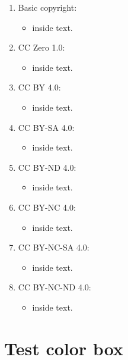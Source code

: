 \begin{enumerate}

\item Basic copyright:
\begin{itemize}
\item \myCopyright inside text.
\end{itemize}

\item CC Zero 1.0: 
\begin{itemize}
\item \CCZEROLicense inside text.
\end{itemize}

\item CC BY 4.0:
\begin{itemize}
\item \CCBYLicense inside text.
\end{itemize}

\item CC BY-SA 4.0:
\begin{itemize}
\item \CCBYSALicense inside text.
\end{itemize}

\item CC BY-ND 4.0:
\begin{itemize}
\item \CCBYNDLicense inside text.
\end{itemize}

\item CC BY-NC 4.0:
\begin{itemize}
\item \CCBYNCLicense inside text.
\end{itemize}

\item CC BY-NC-SA 4.0:
\begin{itemize}
\item \CCBYNCSALicense inside text.
\end{itemize}

\item CC BY-NC-ND 4.0:
\begin{itemize}
\item \CCBYNCNDLicense inside text.
\end{itemize}

\end{enumerate}

\section{Test color box}

